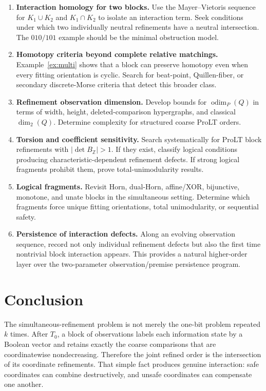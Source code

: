 \documentclass[11pt]{article}
\theoremstyle{definition}
\newcommand{\odim}{\operatorname{odim}}
\begin{document}
\begin{enumerate}[label=\textbf{N\arabic*.},leftmargin=2.6em]
\item \textbf{Interaction homology for two blocks.} Use the Mayer--Vietoris sequence for $K_1\cup K_2$ and $K_1\cap K_2$ to isolate an interaction term. Seek conditions under which two individually neutral refinements have a neutral intersection. The $010/101$ example should be the minimal obstruction model.

\item \textbf{Homotopy criteria beyond complete relative matchings.} Example~\ref{ex:multi} shows that a block can preserve homotopy even when every fitting orientation is cyclic. Search for beat-point, Quillen-fiber, or secondary discrete-Morse criteria that detect this broader class.

\item \textbf{Refinement observation dimension.} Develop bounds for $\odim_P(Q)$ in terms of width, height, deleted-comparison hypergraphs, and classical $\dim_2(Q)$. Determine complexity for structured coarse ProLT orders.

\item \textbf{Torsion and coefficient sensitivity.} Search systematically for ProLT block refinements with $|\det B_{\mathbb Z}|>1$. If they exist, classify logical conditions producing characteristic-dependent refinement defects. If strong logical fragments prohibit them, prove total-unimodularity results.

\item \textbf{Logical fragments.} Revisit Horn, dual-Horn, affine/XOR, bijunctive, monotone, and unate blocks in the simultaneous setting. Determine which fragments force unique fitting orientations, total unimodularity, or sequential safety.

\item \textbf{Persistence of interaction defects.} Along an evolving observation sequence, record not only individual refinement defects but also the first time nontrivial block interaction appears. This provides a natural higher-order layer over the two-parameter observation/premise persistence program.
\end{enumerate}

\section{Conclusion}

The simultaneous-refinement problem is not merely the one-bit problem repeated $k$ times. After $T_0$, a block of observations labels each information state by a Boolean vector and retains exactly the coarse comparisons that are coordinatewise nondecreasing. Therefore the joint refined order is the intersection of its coordinate refinements. That simple fact produces genuine interaction: safe coordinates can combine destructively, and unsafe coordinates can compensate one another.
\end{document}

